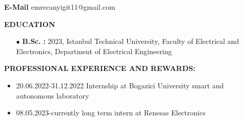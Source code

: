 \textbf{E-Mail\makebox[3.685cm]{\hfill \textbf{:}}}\hspace{0.225em} emrecanyigit11@gmail.com \\ %

\vspace{5mm}

\renewcommand\labelitemi{\normalsize$\bullet$} 			%

\textbf{EDUCATION\makebox[2.41cm]{\hfill \textbf{:}}}  	%
\vspace{-3mm}

\begin{itemize}[leftmargin=5.15cm,itemsep=-0.25em,labelsep=2mm] %
	\item [$\bullet$ \hspace{1em}\textbf{B.Sc.} \hspace{6.85em} \textbf{:}] 2023, Istanbul Technical University, Faculty of Electrical and Electronics, Department of Electrical Engineering
\end{itemize}

\textbf{PROFESSIONAL EXPERIENCE AND REWARDS:}   
\vspace{-3mm}
\begin{itemize}[leftmargin=0.7cm,itemsep=-0.25em,labelsep=5mm] %
	\item 20.06.2022-31.12.2022 Internship at Bogazici University smart and autonomous laboratory
	\item 08.05.2023-currently long term intern at Renesas Electronics
\end{itemize}

